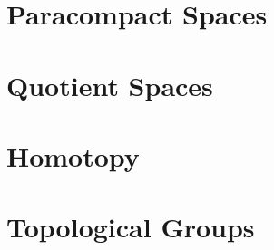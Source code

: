 \section{Paracompact Spaces}



\section{Quotient Spaces}









\section{Homotopy}
\addtocounter{subsection}{7}



\section{Topological Groups}




